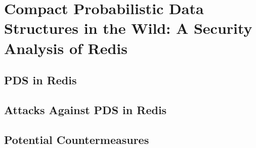 \chapter{Compact Probabilistic Data Structures in the Wild: A Security Analysis of Redis}\label{chap:redis}



\section{PDS in Redis}


\section{Attacks Against PDS in Redis}


\section{Potential Countermeasures}

